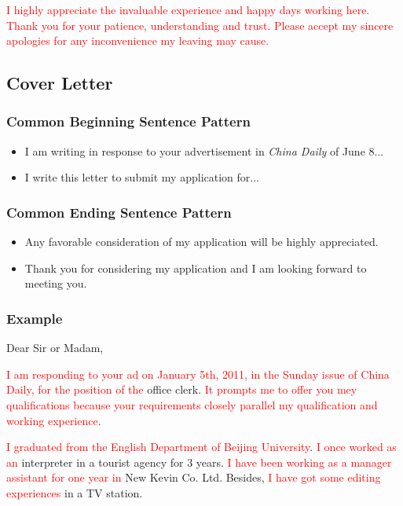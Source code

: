 \documentclass{article}
\begin{document}
\par \textcolor{red}{I highly appreciate the invaluable experience and happy days working
  here. Thank you for your patience, understanding and trust. Please accept my sincere
  apologies for any inconvenience my leaving may cause.}



\subsection{Cover Letter}
\label{sec:letter}

\subsubsection{Common Beginning Sentence Pattern}
\label{sec:comm-begnn-sent}
\begin{itemize}
\item I am writing in response to your advertisement in \emph{China Daily} of June 8...
\item I write this letter to submit my application for...
\end{itemize}

\subsubsection{Common Ending Sentence Pattern}
\label{sec:comm-ending-sent-2}
\begin{itemize}
\item Any favorable consideration of my application will be highly appreciated.
\item Thank you for considering my application and I am looking forward to meeting you.
\end{itemize}

\subsubsection{Example}
\label{sec:example-2}
Dear Sir or Madam,
\par \textcolor{red}{I am responding to your ad on January 5th, 2011, in the Sunday issue of China Daily, for the position of the} office clerk. \textcolor{red}{It prompts me to offer you mey qualifications because your requirements closely parallel my qualification and working experience}. 

\par \textcolor{red}{I graduated from the English Department of Beijing
  University}. \textcolor{red}{I once worked as an} interpreter in a tourist agency for 3
years. \textcolor{red}{I have been working as a manager assistant for one year in} New
Kevin Co. Ltd. Besides, \textcolor{red}{I have got some editing experiences} in a TV
station.
\end{document}
